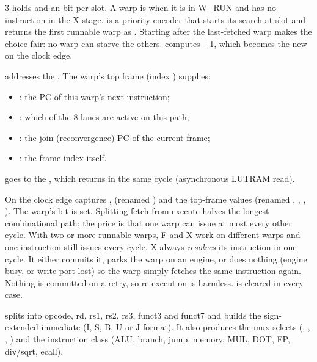 \begin{multicols*}{3}
 holds  and an  bit per slot. A warp is  when it is in W\_RUN and has no instruction in the X stage.
 is a priority encoder that starts its search at slot  and returns the first runnable warp as . Starting after the last-fetched warp makes the choice fair: no warp can starve the others.
 computes +1, which becomes the new  on the clock edge.

 addresses the . The warp's top frame (index ) supplies:
\begin{itemize}
\item {}: the PC of this warp's next instruction;
\item {}: which of the 8 lanes are active on this path;
\item {}: the join (reconvergence) PC of the current frame;
\item {}: the frame index itself.
\end{itemize}
 goes to the , which returns  in the same cycle (asynchronous LUTRAM read).

On the clock edge  captures ,  (renamed ) and the top-frame values (renamed , , , ). The warp's  bit is set.
Splitting fetch from execute halves the longest combinational path; the price is that one warp can issue at most every other cycle. With two or more runnable warps, F and X work on different warps and one instruction still issues every cycle.
X always \emph{resolves} its instruction in one cycle. It either commits it, parks the warp on an engine, or does nothing (engine busy, or write port lost) so the warp simply fetches the same instruction again. Nothing is committed on a retry, so re-execution is harmless.  is cleared in every case.

 splits  into opcode, rd, rs1, rs2, rs3, funct3 and funct7 and builds the sign-extended immediate  (I, S, B, U or J format). It also produces the mux selects (, , , ) and the instruction class (ALU, branch, jump, memory, MUL, DOT, FP, div/sqrt, ecall).


\end{multicols*}
